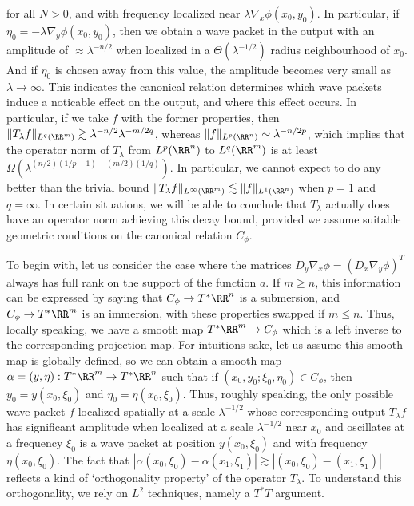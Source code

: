 for all $N > 0$, and with frequency localized near $\lambda \nabla_x \phi(x_0,y_0)$. In particular, if $\eta_0 = - \lambda \nabla_y \phi(x_0,y_0)$, then we obtain a wave packet in the output with an amplitude of $\approx \lambda^{-n/2}$ when localized in a $\Theta(\lambda^{-1/2})$ radius neighbourhood of $x_0$. And if $\eta_0$ is chosen away from this value, the amplitude becomes very small as $\lambda \to \infty$. This indicates the canonical relation determines which wave packets induce a noticable effect on the output, and where this effect occurs. In particular, if we take $f$ with the former properties, then $\| T_\lambda f \|_{L^q(\RR^m)} \gtrsim \lambda^{-n/2} \lambda^{-m/2q}$, whereas $\| f \|_{L^p(\RR^n)} \sim \lambda^{-n/2p}$, which implies that the operator norm of $T_\lambda$ from $L^p(\RR^n)$ to $L^q(\RR^m)$ is at least $\Omega(\lambda^{(n/2)(1/p-1) - (m/2)(1/q)})$. In particular, we cannot expect to do any better than the trivial bound $\| T_\lambda f \|_{L^\infty(\RR^m)} \lesssim \| f \|_{L^1(\RR^n)}$ when $p = 1$ and $q = \infty$. In certain situations, we will be able to conclude that $T_\lambda$ actually does have an operator norm achieving this decay bound, provided we assume suitable geometric conditions on the canonical relation $C_\phi$.

To begin with, let us consider the case where the matrices $D_y \nabla_x \phi = (D_x \nabla_y \phi)^T$ always has full rank on the support of the function $a$. If $m \geq n$, this information can be expressed by saying that $C_\phi \to T^* \RR^n$ is a submersion, and $C_\phi \to T^* \RR^m$ is an immersion, with these properties swapped if $m \leq n$. Thus, locally speaking, we have a smooth map $T^* \RR^m \to C_\phi$ which is a left inverse to the corresponding projection map. For intuitions sake, let us assume this smooth map is globally defined, so we can obtain a smooth map $\alpha = (y,\eta): T^* \RR^m \to T^* \RR^n$ such that if $(x_0,y_0;\xi_0,\eta_0) \in C_\phi$, then $y_0 = y(x_0,\xi_0)$ and $\eta_0 = \eta(x_0,\xi_0)$. Thus, roughly speaking, the only possible wave packet $f$ localized spatially at a scale $\lambda^{-1/2}$ whose corresponding output $T_\lambda f$ has significant amplitude when localized at a scale $\lambda^{-1/2}$ near $x_0$ and oscillates at a frequency $\xi_0$ is a wave packet at position $y(x_0,\xi_0)$ and with frequency $\eta(x_0,\xi_0)$. The fact that $|\alpha(x_0,\xi_0) - \alpha(x_1,\xi_1)| \gtrsim |(x_0,\xi_0) - (x_1,\xi_1)|$ reflects a kind of `orthogonality property' of the operator $T_\lambda$. To understand this orthogonality, we rely on $L^2$ techniques, namely a $T^*T$ argument.

